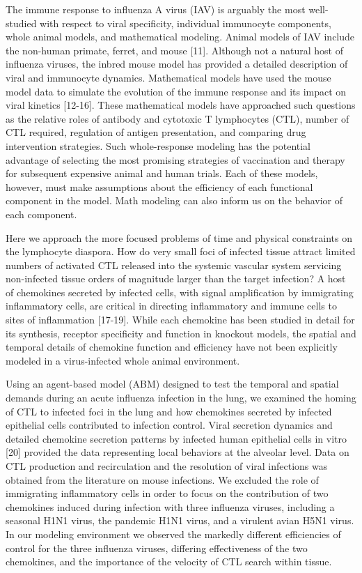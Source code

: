 \documentclass[10pt]{article}
\begin{document}
The immune response to influenza A virus (IAV) is arguably the most well-studied with respect to viral specificity, individual immunocyte components, whole animal models, and mathematical modeling.  Animal models of IAV include the non-human primate, ferret, and mouse [11].   Although not a natural host of influenza viruses, the inbred mouse model has provided a detailed description of viral and immunocyte dynamics.  Mathematical models have used the mouse model data to simulate the evolution of the immune response and its impact on viral kinetics [12-16].  These mathematical models have approached such questions as the relative roles of antibody and cytotoxic T lymphocytes (CTL), number of CTL required, regulation of antigen presentation, and comparing drug intervention strategies.  Such whole-response modeling has the potential advantage of selecting the most promising strategies of vaccination and therapy for subsequent expensive animal and human trials.   Each of these models, however, must make assumptions about the efficiency of each functional component in the model.   Math modeling can also inform us on the behavior of each component.

Here we approach the more focused problems of time and physical constraints on the lymphocyte diaspora.  How do very small foci of infected tissue attract limited numbers of activated CTL released into the systemic vascular system servicing non-infected tissue orders of magnitude larger than the target infection?  A host of chemokines secreted by infected cells, with signal amplification by immigrating inflammatory cells, are critical in directing inflammatory and immune cells to sites of inflammation [17-19].  While each chemokine has been studied in detail for its synthesis, receptor specificity and function in knockout models, the spatial and temporal details of chemokine function and efficiency have not been explicitly modeled in a virus-infected whole animal environment.

Using an agent-based model (ABM) designed to test the temporal and spatial demands during an acute influenza infection in the lung, we examined the homing of CTL to infected foci in the lung and how chemokines secreted by infected epithelial cells contributed to infection control.   Viral secretion dynamics and detailed chemokine secretion patterns by infected human epithelial cells in vitro [20] provided the data representing local behaviors at the alveolar level.  Data on CTL production and recirculation and the resolution of viral infections was obtained from the literature on mouse infections.   We excluded the role of immigrating inflammatory cells in order to focus on the contribution of two chemokines induced during infection with three influenza viruses, including a seasonal H1N1 virus, the pandemic H1N1 virus, and a virulent avian H5N1 virus.  In our modeling environment we observed the markedly different efficiencies of control for the three influenza viruses, differing effectiveness of the two chemokines, and the importance of the velocity of CTL search within tissue.
\end{document}
